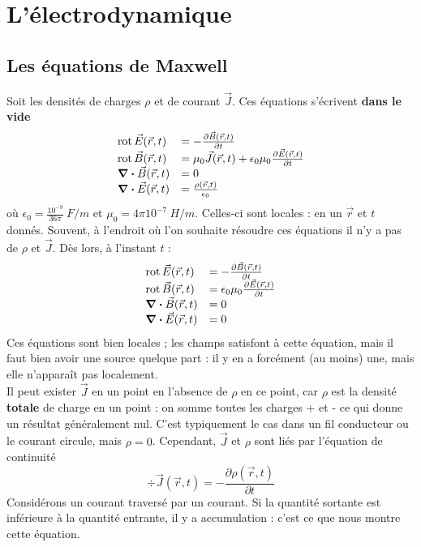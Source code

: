\chapter{L'électrodynamique}
\section{Les équations de Maxwell}
Soit les densités de charges $\rho$ et de courant $\vec{J}$. Ces équations 
s'écrivent \textbf{dans le vide}
\begin{equation}
\begin{array}{ll}
\rot \vec E(\vec r,t) &= -\frac{\partial\vec{B}(\vec{r},t)}{\partial t}\\
\rot \vec B(\vec r,t) &= \mu_0\vec{J}(\vec r,t) + \epsilon_0\mu_0\frac{\partial \vec E
(\vec r,t)}{\partial t}\\
\div \vec{B}(\vec r,t) &= 0\\
\div \vec{E}(\vec r,t) &= \frac{\rho(\vec r,t)}{\epsilon_0}
\end{array}
\end{equation}
où $\epsilon_0 = \frac{10^{-9}}{36\pi}\ F/m$ et $\mu_0 = 4\pi 10^{-7}\ H/m$.
Celles-ci sont locales : en un $\vec{r}$ et $t$ donnés. Souvent, à l'endroit où l'on 
souhaite résoudre ces équations il n'y a pas de $\rho$ et $\vec{J}$. Dès lors, à 
l'instant $t$ :
\begin{equation}
\begin{array}{ll}
\rot \vec E(\vec r,t) &= -\frac{\partial\vec{B}(\vec{r},t)}{\partial t}\\
\rot \vec B(\vec r,t) &= \epsilon_0\mu_0\frac{\partial \vec E
(\vec r,t)}{\partial t}\\
\div \vec{B}(\vec r,t) &= 0\\
\div \vec{E}(\vec r,t) &= 0
\end{array}
\end{equation}
Ces équations sont bien locales ; les champs satisfont à cette équation, mais il faut bien avoir 
une source quelque part : il y en a forcément (au moins) une, mais elle n'apparaît 
pas localement.\\

\danger Il peut exister $\vec J$ en un point en l'absence de $\rho$ en ce point, car $\rho$ est 
la densité \textbf{totale} de charge en un point : on somme toutes les charges + et - ce qui 
donne un résultat généralement nul. C'est typiquement le cas dans un fil conducteur ou le 
courant circule, mais $\rho = 0$. Cependant, $\vec{J}$ et $\rho$ sont liés par l'équation de 
continuité
\begin{equation}
\div \vec{J}(\vec{r},t) = -\dfrac{\partial\rho(\vec{r},t)}{\partial t}
\end{equation}
Considérons un courant traversé par un courant. Si la quantité sortante est inférieure à la 
quantité entrante, il y a accumulation : c'est ce que nous montre cette équation.\\

